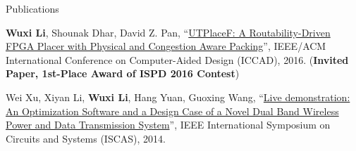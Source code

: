 \begin{rSection}{Publications}
\begin{description}[font=\normalfont]
\item[{[C2]}]{
    \textbf{Wuxi Li}, Shounak Dhar, David Z. Pan,
    ``\href{http://ieeexplore.ieee.org/document/7827643/}{UTPlaceF: A Routability-Driven FPGA Placer with Physical and Congestion Aware Packing}'',
    IEEE/ACM International Conference on Computer-Aided Design (ICCAD), 2016.
    (\textbf{Invited Paper, 1st-Place Award of ISPD 2016 Contest})
}

\item[{[C1]}]{
    Wei Xu, Xiyan Li, \textbf{Wuxi Li}, Hang Yuan, Guoxing Wang,
    ``\href{http://ieeexplore.ieee.org/document/6865159/}{Live demonstration: An Optimization Software and a Design Case of a Novel Dual Band Wireless Power and Data Transmission System}'',
    IEEE International Symposium on Circuits and Systems (ISCAS), 2014.
}

\end{description}

\end{rSection}
